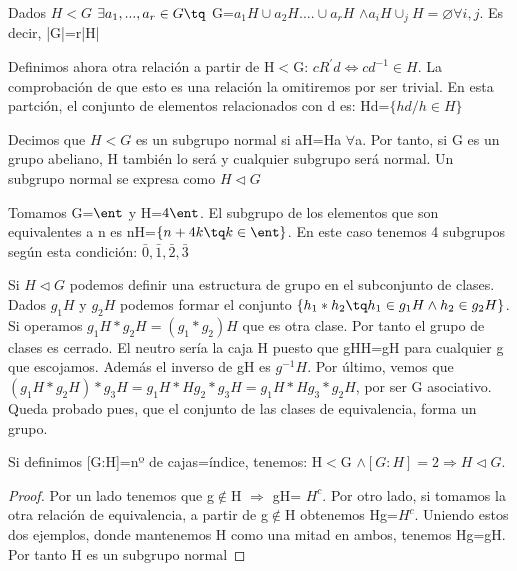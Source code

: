 \documentclass[a4paper,10pt]{apuntes}
\begin{document}
  \begin{theorem}
   Dados $H<G$  $\exists a_{1},...,a_{r}\in G\tq$  G=$a_{1}H \cup a_{2}H.... \cup a_{r}H$  $\wedge a_{i}H\cup_{j}H=\varnothing \forall i,j$.
   Es decir, |G|=r|H|
  \end{theorem}

  Definimos ahora otra relación a partir de H$<$G: $cR^{'}d \Leftrightarrow cd^{-1}\in H$. La comprobación de que esto es una relación
  la omitiremos por ser trivial. En esta partción, el conjunto de elementos relacionados con d es: Hd=$\{hd/h\in H\}$
  \begin{defn}
   Decimos que $H<G$  es un subgrupo normal si aH=Ha $\forall$a. Por tanto, si G es un grupo abeliano, H también lo será y cualquier
   subgrupo será normal. Un subgrupo normal se expresa como $H\lhd G$
  \end{defn}
  \begin{example}
   Tomamos G=$\ent$  y H=$4\ent$. 
   El subgrupo de los elementos que son equivalentes a n es nH=$\{n+4k\tq k \in \ent\}$.
   En este caso tenemos 4 subgrupos según esta condición: $\bar{0},\bar{1},\bar{2},\bar{3}$
  \end{example}
  
  Si $H\lhd G$  podemos definir una estructura de grupo en el subconjunto de clases.
  Dados $g_{1}H$  y $g_{2}H$  podemos formar el conjunto $\{h_{1}\ast h_{2}\tq h_{1}\in g_{1}H \wedge h_{2}\in g_{2}H\}$. Si operamos
  $g_{1}H\ast g_{2}H=(g_{1}\ast g_{2})H$  que es otra clase. Por tanto el grupo de clases es cerrado.
  El neutro sería la caja H puesto que gHH=gH para cualquier g que escojamos. Además el inverso de gH es $g^{-1}H$.
  Por último, vemos que $(g_{1}H\ast g_{2}H)\ast g_{3}H=g_{1}H\ast Hg_{2}\ast g_{3}H=g_{1}H\ast Hg_{3}\ast g_{2}H$, por ser G asociativo. Queda probado pues, 
  que el conjunto de las clases de equivalencia, forma un grupo.
  
  \begin{theorem}
   Si definimos [G:H]=nº de cajas=índice, tenemos:
   H$<$G $\wedge[G:H]=2 \Rightarrow H \lhd G$.
  \end{theorem}
  \begin{proof}
   Por un lado tenemos que g$\notin$H $\Rightarrow$  gH= $H^{c}$.
   Por otro lado, si tomamos la otra relación de equivalencia, a partir de g$\notin$H obtenemos Hg=$H^{c}$.
   Uniendo estos dos ejemplos, donde mantenemos H como una mitad en ambos, tenemos Hg=gH. Por tanto H es un subgrupo normal
  \end{proof}
\end{document}
